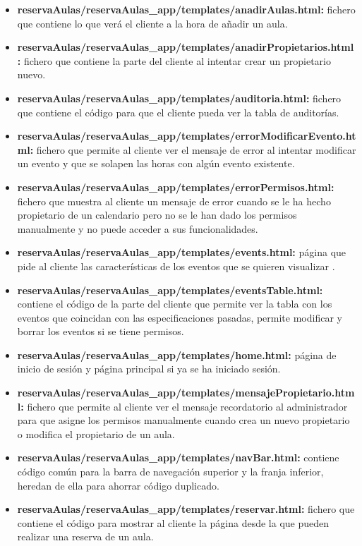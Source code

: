 \begin{itemize}
    \item \textbf{reservaAulas/reservaAulas\_app/templates/anadirAulas.html:} fichero que contiene lo que verá el cliente a la hora de añadir un aula.
    \item \textbf{reservaAulas/reservaAulas\_app/templates/anadirPropietarios.html:} fichero que contiene la parte del cliente al intentar crear un propietario nuevo.
    \item \textbf{reservaAulas/reservaAulas\_app/templates/auditoria.html:} fichero que contiene el código para que el cliente pueda ver la tabla de auditorías.
    \item \textbf{reservaAulas/reservaAulas\_app/templates/errorModificarEvento.html:} fichero que permite al cliente ver el mensaje de error al intentar modificar un evento y que se solapen las horas con algún evento existente.
    \item \textbf{reservaAulas/reservaAulas\_app/templates/errorPermisos.html:} fichero que muestra al cliente un mensaje de error cuando se le ha hecho propietario de un calendario pero no se le han dado los permisos manualmente y no puede acceder a sus funcionalidades.
    \item \textbf{reservaAulas/reservaAulas\_app/templates/events.html:} página que pide al cliente las características de los eventos que se quieren visualizar .
    \item \textbf{reservaAulas/reservaAulas\_app/templates/eventsTable.html:} contiene el código de la parte del cliente que permite ver la tabla con los eventos que coincidan con las especificaciones pasadas, permite modificar y borrar los eventos si se tiene permisos.
    \item \textbf{reservaAulas/reservaAulas\_app/templates/home.html:} página de inicio de sesión y página principal si ya se ha iniciado sesión.
    \item \textbf{reservaAulas/reservaAulas\_app/templates/mensajePropietario.html:} fichero que permite al cliente ver el mensaje recordatorio al administrador para que asigne los permisos manualmente cuando crea un nuevo propietario o modifica el propietario de un aula.
    \item \textbf{reservaAulas/reservaAulas\_app/templates/navBar.html:} contiene código común para la barra de navegación superior y la franja inferior, heredan de ella para ahorrar código duplicado.
    \item \textbf{reservaAulas/reservaAulas\_app/templates/reservar.html:} fichero que contiene el código para mostrar al cliente la página desde la que pueden realizar una reserva de un aula.

\end{itemize}
